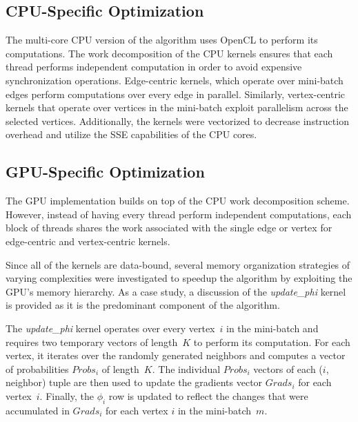 
\subsection*{CPU-Specific Optimization}
The multi-core
CPU version of the algorithm uses OpenCL to perform its computations. The
work decomposition of the CPU kernels ensures that each thread performs
independent computation in order to avoid expensive synchronization operations.
Edge-centric kernels, which operate over mini-batch edges perform computations
over every edge in parallel.  Similarly, vertex-centric kernels that operate
over vertices in the mini-batch exploit parallelism across the selected
vertices.
Additionally, the kernels were vectorized to decrease instruction overhead and
utilize the SSE capabilities of the CPU cores.

\subsection*{GPU-Specific Optimization}
\label{gpu-design}
The GPU implementation builds on top of the CPU work decomposition scheme.
However, instead of having every thread perform independent computations, each
block of threads shares the work associated with the single edge or vertex for
edge-centric and vertex-centric kernels.

Since all of the kernels are data-bound, several memory organization strategies
of varying complexities were investigated to speedup the algorithm by
exploiting the GPU's memory hierarchy.
As a case study, a discussion of the \textit{update\_phi} kernel is provided as it is
the predominant component of the algorithm.

The \textit{update\_phi} kernel operates over every vertex~$i$ in the mini-batch and
requires two temporary vectors of length~$K$ to perform its computation. For
each vertex, it iterates over the randomly generated neighbors and computes a
vector of probabilities $Probs_i$ of length~$K$. The individual $Probs_i$ vectors
of each ($i$, neighbor) tuple are then used to update the gradients vector
$Grads_i$ for each vertex~$i$. Finally, the $\phi_i$ row is updated to
reflect the changes that were accumulated in $Grads_i$ for each vertex $i$ in the
mini-batch~$m$.

